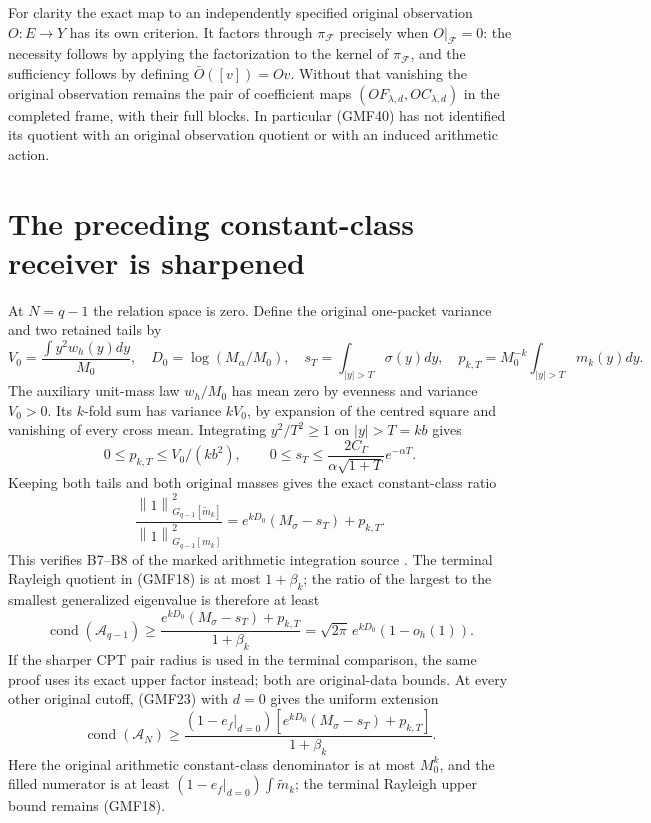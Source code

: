 \documentclass[11pt]{article}
\newcommand{\Fcal}{\mathscr F}
\newcommand{\norm}[1]{\left\lVert#1\right\rVert}
\DeclareMathOperator{\cond}{cond}
\begin{document}
For clarity the exact map to an independently specified
original observation \(O:E\to Y\) has its own criterion.
It factors through \(\pi_\Fcal\) precisely when
\(O|_\Fcal=0\): the necessity follows by applying the
factorization to the kernel of \(\pi_\Fcal\), and the
sufficiency follows by defining \(\bar O([v])=Ov\).
Without that vanishing the original observation remains
the pair of coefficient maps
\((OF_{\lambda,d},OC_{\lambda,d})\) in the completed frame,
with their full blocks.  In particular (GMF40) has not
identified its quotient with an original observation
quotient or with an induced arithmetic action.

\section{The preceding constant-class receiver is sharpened}

At \(N=q-1\) the relation space is zero.  Define the original
one-packet variance and two retained tails by
\[
 V_0=\frac{\int y^2w_h(y)dy}{M_0},\quad
 D_0=\log(M_\alpha/M_0),\quad
 s_T=\int_{|y|>T}\sigma(y)dy,\quad
 p_{k,T}=M_0^{-k}\int_{|y|>T}m_k(y)dy.
\]
The auxiliary unit-mass law \(w_h/M_0\) has mean zero by
evenness and variance \(V_0>0\).
Its \(k\)-fold sum has variance \(kV_0\), by expansion of
the centred square and vanishing of every cross mean.
Integrating \(y^2/T^2\ge1\) on \(|y|>T=kb\) gives
\[
 0\le p_{k,T}\le V_0/(kb^2),\qquad
 0\le s_T\le
 \frac{2C_\Gamma}{\alpha\sqrt{1+T}}e^{-\alpha T}.
\]
Keeping both tails and both original masses gives the
exact constant-class ratio
\begin{equation}\tag{GMF42}
 \frac{\norm{1}_{G_{q-1}[\widetilde m_k]}^2}
      {\norm{1}_{G_{q-1}[m_k]}^2}
 =e^{kD_0}(M_\sigma-s_T)+p_{k,T}.
\end{equation}
This verifies B7--B8 of the marked arithmetic integration
source \cite{markedProvider}.
The terminal Rayleigh quotient in (GMF18) is at most
\(1+\beta_k\); the ratio of the largest to the smallest
generalized eigenvalue is therefore at least
\begin{equation}\tag{GMF43}
 \cond(\mathcal A_{q-1})
 \ge\frac{e^{kD_0}(M_\sigma-s_T)+p_{k,T}}{1+\beta_k}
 =\sqrt{2\pi}\,e^{kD_0}(1-o_h(1)).
\end{equation}
If the sharper CPT pair radius is used in the terminal
comparison, the same proof uses its exact upper factor
instead; both are original-data bounds.
At every other original cutoff, (GMF23) with \(d=0\)
gives the uniform extension
\[
 \cond(\mathcal A_N)\ge
 \frac{(1-e_f|_{d=0})
       [e^{kD_0}(M_\sigma-s_T)+p_{k,T}]}
      {1+\beta_k}.
\]
Here the original arithmetic constant-class denominator
is at most \(M_0^k\), and the filled numerator is at least
\((1-e_f|_{d=0})\int\widetilde m_k\); the terminal
Rayleigh upper bound remains (GMF18).
\end{document}
